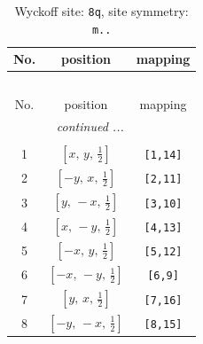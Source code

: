 \documentclass[fleqn,8pt]{jsarticle}
\begin{document}
\begin{longtable}{ccc}
\caption{Wyckoff site: {\tt 8q}, site symmetry: {\tt m..}}
 \\
 \hline \hline
No. & position & mapping \\ \hline \endfirsthead

\multicolumn{2}{l}{\tablename\ \thetable{}} \\
 \hline \hline
No. & position & mapping \\ \hline \endhead

 \hline \hline
\multicolumn{2}{r}{\footnotesize\it continued ...} \\ \endfoot

 \hline \hline
\multicolumn{2}{r}{} \\ \endlastfoot

1 & $\left[ x,\, y,\, \frac{1}{2} \right]$ & {\tt [1,14]} \\ \hline
2 & $\left[ - y,\, x,\, \frac{1}{2} \right]$ & {\tt [2,11]} \\ \hline
3 & $\left[ y,\, - x,\, \frac{1}{2} \right]$ & {\tt [3,10]} \\ \hline
4 & $\left[ x,\, - y,\, \frac{1}{2} \right]$ & {\tt [4,13]} \\ \hline
5 & $\left[ - x,\, y,\, \frac{1}{2} \right]$ & {\tt [5,12]} \\ \hline
6 & $\left[ - x,\, - y,\, \frac{1}{2} \right]$ & {\tt [6,9]} \\ \hline
7 & $\left[ y,\, x,\, \frac{1}{2} \right]$ & {\tt [7,16]} \\ \hline
8 & $\left[ - y,\, - x,\, \frac{1}{2} \right]$ & {\tt [8,15]} \\
\end{longtable}
\renewcommand{\arraystretch}{1.2}
\end{document}
